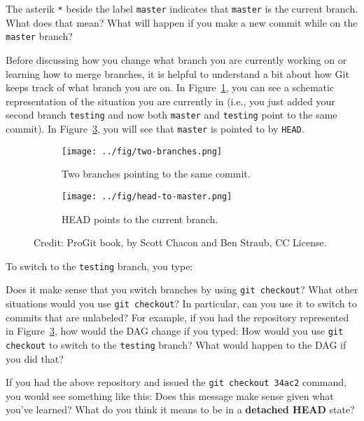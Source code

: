 \documentclass{article}
\begin{document}
\begin{enumerate}
The asterik \texttt{*} beside the label \texttt{master} indicates that
\texttt{master} is the current branch.  What does that mean?  What will
happen if you make a new commit while on the \texttt{master} branch?

Before discussing how you change what branch you are currently working on or
learning how to merge branches, it is helpful to understand a bit about how Git
keeps track of what branch you are on.  In Figure~\ref{fig:1}, you can see a
schematic representation of the situation you are currently in (i.e., you just
added your second branch \texttt{testing} and now both \texttt{master} and
\texttt{testing} point to the same commit).  In Figure~\ref{fig:2}, you
will see that \texttt{master} is pointed to by \texttt{HEAD}.

\begin{figure}[h]
  \begin{subfigure}[b]{0.4\textwidth}
    \centering
    \texttt{[image: ../fig/two-branches.png]}
    \caption{Two branches pointing to the same commit.}
    \label{fig:1}
  \end{subfigure} 
  \hfill
  \begin{subfigure}[b]{0.4\textwidth}
    \centering
    \texttt{[image: ../fig/head-to-master.png]}
    \caption{HEAD points to the current branch.}
    \label{fig:2}
  \end{subfigure}
\caption{Credit:  ProGit book, by Scott Chacon and Ben Straub, CC License.}
\end{figure}

To switch to the \texttt{testing} branch, you type:

Does it make sense that you switch branches by using \texttt{git checkout}?
What other situations would you use \texttt{git checkout}?  In particular,
can you use it to switch to commits that are unlabeled?  For example, if you
had the repository represented in Figure~\ref{fig:2}, how would the DAG change
if you typed:
How would you use \texttt{git checkout} to switch to the \texttt{testing}
branch?  What would happen to the DAG if you did that? 

If you had the above repository and issued the \texttt{git checkout 34ac2}
command, you would see something like this:
%
%
%
%
Does this message make sense given what you've learned? What do you think
it means to be in a \textbf{detached HEAD} state?


\end{enumerate}
\end{document}
